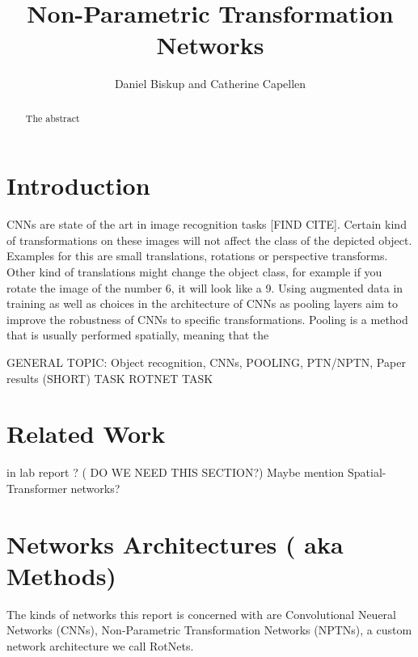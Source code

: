 \documentclass{llncs}
\begin{document}
%
\frontmatter          %
%
\pagestyle{headings}  %
%
\mainmatter              %
%
\title{Non-Parametric Transformation Networks}
%
%  
%
\author{Daniel Biskup and Catherine Capellen}
%
%
%

\maketitle              %

\begin{abstract}
The abstract 
\end{abstract}
%

\section{Introduction}
CNNs are state of the art in image recognition tasks [FIND CITE]. Certain kind of transformations on these images will not affect the class of the depicted object. 
Examples for this are small translations, rotations or perspective transforms. Other kind of translations might change the object class, for example if you rotate the image of the number 6, it will look like a 9. 
Using augmented data in training as well as choices in the architecture of CNNs as pooling layers aim to improve the robustness of CNNs to specific transformations. 
Pooling is a method that is usually performed spatially, meaning that the 

GENERAL TOPIC: Object recognition, CNNs, POOLING, PTN/NPTN, Paper results (SHORT) 
TASK
ROTNET TASK

\section{Related Work}
in lab report ? ( DO WE NEED THIS SECTION?) Maybe mention Spatial-
Transformer networks?

\section{Networks Architectures ( aka Methods)}
The kinds of networks this report is concerned with are Convolutional Neueral Networks (CNNs), Non-Parametric Transformation Networks (NPTNs), a custom network architecture we call RotNets.
\end{document}

